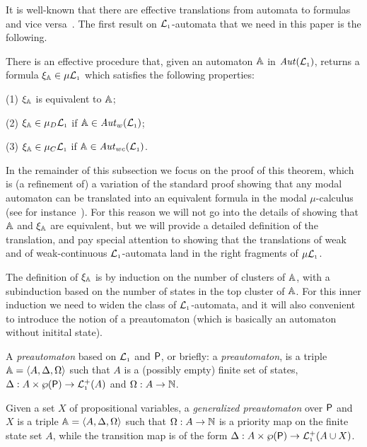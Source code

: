 
\newcommand{\ytr}{\mathtt{tr}}

It is well-known that there are effective translations from automata to formulas
and vice versa~\cite{xxxx}.
The first result on $\mathcal{L}_{\scriptscriptstyle 1}$-automata that we need in this paper is the following.

\begin{theorem}\label{t:autofor}
There is an effective procedure that, given an automaton $\mathbb{A}$ in 
$\mathit{Aut}(\mathcal{L}_{\scriptscriptstyle 1})$, returns a formula $\xi_{\mathbb{A}} \in \mu\mathcal{L}_{\scriptscriptstyle 1}$ which satisfies
the following properties:

(1) $\xi_{\mathbb{A}}$ is equivalent to $\mathbb{A}$;

(2) $\xi_{\mathbb{A}} \in \mu_{D}\mathcal{L}_{\scriptscriptstyle 1}$ if $\mathbb{A} \in \mathit{Aut}_{w}(\mathcal{L}_{\scriptscriptstyle 1})$;

(3) $\xi_{\mathbb{A}} \in \mu_{C}\mathcal{L}_{\scriptscriptstyle 1}$ if $\mathbb{A} \in \mathit{Aut}_{wc}(\mathcal{L}_{\scriptscriptstyle 1})$.
\end{theorem}

In the remainder of this subsection
we focus on the proof of this theorem, which is (a refinement of)
a variation of the standard proof showing that any modal automaton can be 
translated into an equivalent formula in the modal $\mu$-calculus (see for
instance~\cite[Section 6]{Ven08}). 
For this reason we will not go into the details of showing that $\mathbb{A}$ and 
$\xi_{\mathbb{A}}$ are equivalent, but we will provide a detailed definition of the 
translation, and pay special attention to showing that the translations of weak
and of weak-continuous $\mathcal{L}_{\scriptscriptstyle 1}$-automata land in the right fragments of 
$\mu\mathcal{L}_{\scriptscriptstyle 1}$. 

The definition of $\xi_{\mathbb{A}}$ is by induction on the number of clusters of
$\mathbb{A}$, with a subinduction based on the number of states in the top cluster 
of $\mathbb{A}$.
For this inner induction we need to widen the class of $\mathcal{L}_{\scriptscriptstyle 1}$-automata, and
it will also convenient to introduce the notion of a preautomaton (which is  
basically an automaton without initital state).

\begin{definition}
A \emph{preautomaton} based on $\mathcal{L}_{\scriptscriptstyle 1}$ and $\mathsf{P}$, or briefly: a
\emph{preautomaton}, is a triple $\mathbb{A} = \langle{A,\Delta,\Omega}\rangle$ such that $A$ is
a (possibly empty) finite set of states, $\Delta: A\times \wp(\mathsf{P}) \to 
\mathcal{L}_{\scriptscriptstyle 1}^+(A)$ and $\Omega: A \to \mathbb{N}$.

Given a set $X$ of propositional variables, a \emph{generalized preautomaton} 
over $\mathsf{P}$ and $X$ is a triple $\mathbb{A} = \langle{A,\Delta,\Omega}\rangle$ such that $\Omega:
A \to \mathbb{N}$ is a priority map on the finite state set $A$, while the transition 
map is of the form $\Delta: A\times \wp(\mathsf{P}) \to \mathcal{L}_{\scriptscriptstyle 1}^+(A\cup X)$.
\end{definition}


